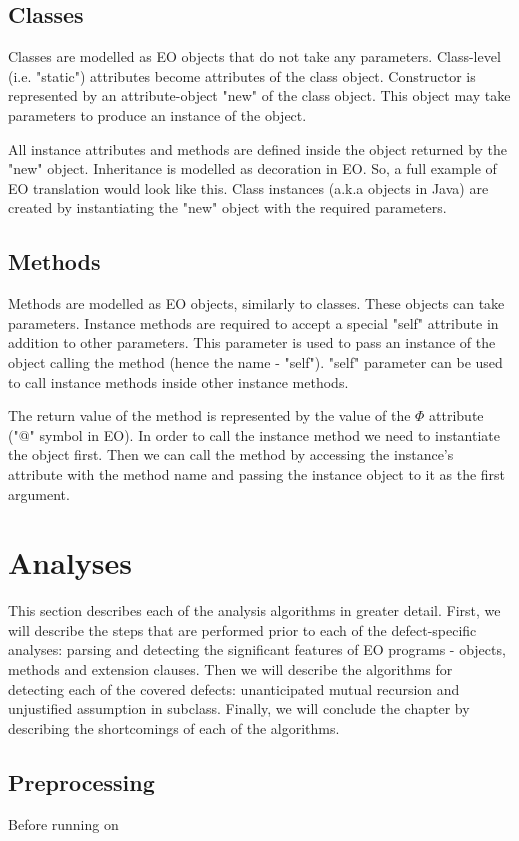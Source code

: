 \subsection{Classes}
Classes are modelled as EO objects that do not take any parameters. Class-level (i.e. "static") attributes become attributes of the class object. Constructor is represented by an attribute-object "new" of the class object. This object may take parameters to produce an instance of the object.

All instance attributes and methods are defined inside the object returned by the "new" object. Inheritance is modelled as decoration in EO. So, a full example of EO translation would look like this. Class instances (a.k.a objects in Java) are created
by instantiating the "new" object with the required parameters.


\subsection{Methods}
Methods are modelled as EO objects, similarly to classes. These objects can take parameters. Instance methods are required to accept a special "self" attribute in addition to other parameters. This parameter is used to pass an instance of the object calling the method (hence the name - "self"). "self" parameter can be used to call instance methods inside other instance methods.

The return value of the method is represented by the value of the $\Phi$ attribute ("@" symbol in EO). In order to call the instance method we need to instantiate the object first. Then we can call the method by accessing the instance's attribute with the method name and passing the instance object to it as the first argument.


\section{Analyses}
This section describes each of the analysis algorithms in greater detail. First, we will describe the steps that are performed prior to each of the defect-specific analyses: parsing and detecting the significant features of EO programs - objects, methods and extension clauses. Then we will describe the algorithms for detecting each of the covered defects: unanticipated mutual recursion and unjustified assumption in subclass. Finally, we will conclude the chapter by describing the shortcomings of each of the algorithms.


\subsection{Preprocessing}
Before running on


